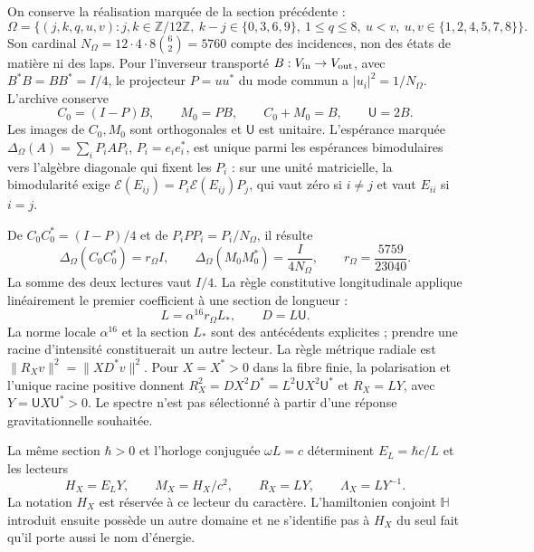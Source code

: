 On conserve la réalisation marquée de la section précédente :
\[
\Omega=\{(j,k,q,u,v):j,k\in\mathbb Z/12\mathbb Z,\ 
k-j\in\{0,3,6,9\},\ 1\leq q\leq8,\ 
u<v,\ u,v\in\{1,2,4,5,7,8\}\}.
\]
Son cardinal $N_\Omega=12\cdot4\cdot8\binom62=5760$ compte des incidences, non des états de matière ni des laps. Pour l’inverseur transporté $B:V_{\rm in}\to V_{\rm out}$, avec $B^*B=BB^*=I/4$, le projecteur $P=uu^*$ du mode commun a $|u_i|^2=1/N_\Omega$. L’archive conserve
\[
C_0=(I-P)B,\qquad M_0=PB,\qquad C_0+M_0=B,\qquad\mathsf U=2B.
\]
Les images de $C_0,M_0$ sont orthogonales et $\mathsf U$ est unitaire. L’espérance marquée $\Delta_\Omega(A)=\sum_iP_iAP_i$, $P_i=e_ie_i^*$, est unique parmi les espérances bimodulaires vers l’algèbre diagonale qui fixent les $P_i$ : sur une unité matricielle, la bimodularité exige $\mathcal E(E_{ij})=P_i\mathcal E(E_{ij})P_j$, qui vaut zéro si $i\ne j$ et vaut $E_{ii}$ si $i=j$.

De $C_0C_0^*=(I-P)/4$ et de $P_iPP_i=P_i/N_\Omega$, il résulte
\begin{equation}
\Delta_\Omega(C_0C_0^*)=r_\Omega I,\qquad
\Delta_\Omega(M_0M_0^*)=\frac{I}{4N_\Omega},\qquad
r_\Omega=\frac{5759}{23040}.
\label{hmtcuatro:gea:retorno}
\end{equation}
La somme des deux lectures vaut $I/4$. La règle constitutive longitudinale applique linéairement le premier coefficient à une section de longueur :
\begin{equation}
L=\alpha^{16}r_\Omega L_*,\qquad D=L\mathsf U.
\label{hmtcuatro:gea:longitud}
\end{equation}
La norme locale $\alpha^{16}$ et la section $L_*$ sont des antécédents explicites ; prendre une racine d’intensité constituerait un autre lecteur. La règle métrique radiale est $\|R_Xv\|^2=\|XD^*v\|^2$. Pour $X=X^*>0$ dans la fibre finie, la polarisation et l’unique racine positive donnent $R_X^2=DX^2D^*=L^2\mathsf UX^2\mathsf U^*$ et $R_X=LY$, avec $Y=\mathsf UX\mathsf U^*>0$. Le spectre n’est pas sélectionné à partir d’une réponse gravitationnelle souhaitée.

La même section $\hbar>0$ et l’horloge conjuguée $\omega L=c$ déterminent $E_L=\hbar c/L$ et les lecteurs
\begin{equation}
H_X=E_LY,\qquad M_X=H_X/c^2,\qquad
R_X=LY,\qquad\Lambda_X=LY^{-1}.
\label{hmtcuatro:gea:lectores}
\end{equation}
La notation $H_X$ est réservée à ce lecteur du caractère. L’hamiltonien conjoint $\mathbb H$ introduit ensuite possède un autre domaine et ne s’identifie pas à $H_X$ du seul fait qu’il porte aussi le nom d’énergie.


